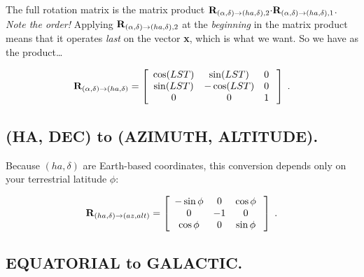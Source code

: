 \documentclass[11pt,preprint]{aastex}
\begin{document}
\noindent The full rotation matrix is the matrix product ${\bf
R}_{(\alpha, \delta) \rightarrow (ha, \delta),2} {\bf \cdot} {\bf
R}_{(\alpha, \delta) \rightarrow (ha, \delta), 1}$.  {\it Note the
order!} Applying ${\bf R}_{(\alpha, \delta) \rightarrow (ha, \delta),2}$
at the {\it beginning} in the matrix product means that it operates {\it
last} on the vector {\bf x}, which is what we want.  So we have as the
product\dots

\begin{eqnarray} 
{\bf R}_{(\alpha, \delta) \rightarrow (ha, \delta)} = \left[ 
\begin{array}{ccc} 
    \cos(LST) & \sin(LST) &  0 \\
    \sin(LST) & -\cos(LST) &  0 \\
            0 &  0        &  1 \\
\end{array} 
\; \right] \; .
\end{eqnarray} 

\subsection {(HA, DEC) to (AZIMUTH, ALTITUDE).}

	Because $(ha, \delta)$ are Earth-based coordinates, this
conversion depends only on your terrestrial latitude $\phi$:

\begin{eqnarray} 
{\bf R}_{(ha, \delta) \rightarrow (az, alt)} = \left[ 
\begin{array}{ccc} 
-\sin \phi &    0    & \cos \phi \\ 
      0    &   -1    &    0      \\ 
 \cos \phi &    0    & \sin \phi \\ 
\end{array} 
\; \right] \; .
\end{eqnarray} 

\subsection {EQUATORIAL to GALACTIC.}
\end{document}
